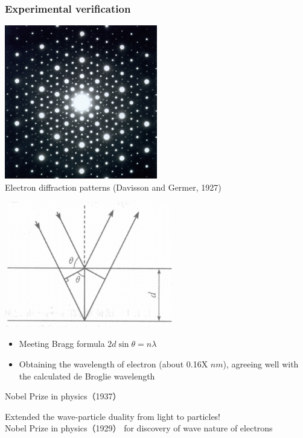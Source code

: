 \begin{frame}   
  \frametitle{Experimental verification}
  \begin{center}
    \includegraphics[width=0.5\textwidth]{figs/elediffr.jpeg} \\
    Electron diffraction patterns (Davisson and Germer, 1927)
\end{center} 
\end{frame}
\begin{frame}   
    \begin{center}
      \includegraphics[width=0.55\textwidth]{figs/scatting.png} \\
    \end{center} 
    \begin{itemize}
        \item Meeting Bragg formula $2d\sin \theta=n\lambda $
        \item Obtaining the wavelength of electron (about 0.16X $nm$), agreeing well with the 
   calculated de Broglie wavelength 
    \end{itemize}
  {\color{deepred} Nobel Prize in physics（1937）}  
  \end{frame}

\begin{frame} 
    \begin{tcolorbox}[colback=yellow!10,colframe=red!75!black,title=]
        Extended the wave-particle duality from light to particles! \\
        {\color{deepred} Nobel Prize in physics（1929）} for discovery of wave nature of electrons
    \end{tcolorbox}  
\end{frame}

